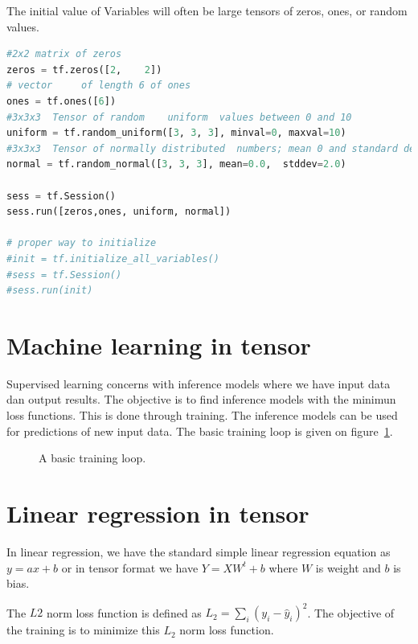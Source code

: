 \documentclass[vecarrow]{svproc}
\begin{document}
The	initial value of Variables will often be large tensors of zeros, ones,	or random
values.

\begin{lstlisting}[language=Python, 
caption={use placeholders in tensor},label={list7}]
#2x2 matrix	of zeros
zeros = tf.zeros([2,	2])
# vector	 of length 6 of ones
ones = tf.ones([6])
#3x3x3	Tensor of random	uniform	 values between 0 and 10
uniform = tf.random_uniform([3, 3, 3], minval=0, maxval=10)
#3x3x3	Tensor of normally distributed	numbers; mean 0 and standard deviation 2
normal = tf.random_normal([3, 3, 3], mean=0.0,	stddev=2.0)

sess = tf.Session()
sess.run([zeros,ones, uniform, normal])

# proper way to initialize
#init = tf.initialize_all_variables()
#sess = tf.Session()
#sess.run(init)
\end{lstlisting}

\section{Machine learning in tensor}

Supervised learning concerns with inference models where we have input data dan output results. The objective is to find inference models with the minimun loss functions. This is done through training. The inference models can be used for predictions of new input data. The basic training loop is given on figure~\ref{fig:6}.

\begin{figure} 
\caption{A basic training loop.}
\label{fig:6} 
\end{figure}

\section{Linear regression in tensor}

In linear regression, we have the standard simple linear regression equation as 
$ y = ax + b $ or in tensor format we have $ Y = XW^t + b$ where $W$ is weight and 
$b$ is bias.

The $L2$ norm loss function is defined as $ L_2 = \sum_i (y_i - \hat{y}_i)^2$. The
objective of the training is to minimize this $L_2$ norm loss function.

 

\end{document}
